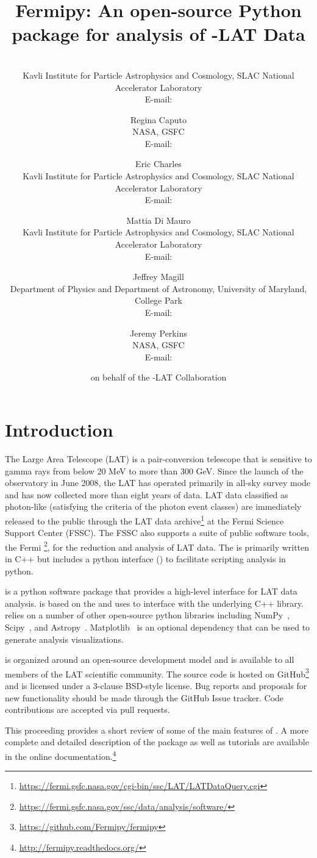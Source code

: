 \documentclass{PoS}
\title{Fermipy: An open-source Python package for analysis of \Fermi-LAT Data}
\author{\speaker{Matthew Wood}\\
  Kavli Institute for Particle Astrophysics and Cosmology, SLAC National Accelerator Laboratory\\
  E-mail: \email{mdwood@slac.stanford.edu}}
\author{Regina Caputo\\
  NASA, GSFC\\
  E-mail: \email{regina.caputo@nasa.gov}}
\author{Eric Charles\\
  Kavli Institute for Particle Astrophysics and Cosmology, SLAC National Accelerator Laboratory\\
  E-mail: \email{echarles@slac.stanford.edu}}
\author{Mattia Di Mauro\\
  Kavli Institute for Particle Astrophysics and Cosmology, SLAC National Accelerator Laboratory\\
  E-mail: \email{mdimauro@slac.stanford.edu}}
\author{Jeffrey Magill\\
  Department of Physics and Department of Astronomy, University of Maryland, College Park\\
  E-mail: \email{jmagill@umd.edu}}
\author{Jeremy Perkins\\
  NASA, GSFC\\
  E-mail: \email{jeremy.s.perkins@nasa.gov}}
\author{on behalf of the \Fermi-LAT Collaboration}
\newcommand{\url}[1]{\href{#1}{#1}}
\begin{document}
\section{Introduction}

The {\Fermi} Large Area Telescope (LAT) is a pair-conversion telescope
that is sensitive to gamma rays from below 20 MeV to more than 300
GeV.  Since the launch of the {\Fermi} observatory in June 2008, the
LAT has operated primarily in all-sky survey mode and has now
collected more than eight years of data.
LAT data classified as photon-like (satisfying the criteria of the
photon event classes) are immediately released to the public
through the LAT data
archive\footnote{\url{https://fermi.gsfc.nasa.gov/cgi-bin/ssc/LAT/LATDataQuery.cgi}}
at the Fermi Science Support Center (FSSC).  The FSSC also supports a
suite of public software tools, the Fermi {\stools}
\footnote{\url{https://fermi.gsfc.nasa.gov/ssc/data/analysis/software/}},
for the reduction and analysis of LAT data.  The {\stools} is
primarily written in C++ but includes a python interface ({\pylike}) to
facilitate scripting analysis in python.



{\fermipy} is a python software package that provides a high-level
interface for LAT data analysis.  {\fermipy} is based on the {\stools}
and uses {\pylike} to interface with the underlying C++ library.
{\fermipy} relies on a number of other open-source python libraries
including NumPy~\cite{oliphant_guide_2006},
Scipy~\cite{scipy}, and
Astropy~\cite{2013A&A...558A..33A}.
Matplotlib~\cite{Hunter:2007:MGE:1251563.1251845} is an optional
dependency that can be used to generate analysis visualizations.

{\fermipy} is organized around an open-source development model and is
available to all members of the LAT scientific community.  The
{\fermipy} source code is hosted on
GitHub\footnote{\url{https://github.com/Fermipy/fermipy}} and is
licensed under a 3-clause BSD-style license.  Bug reports and
proposals for new functionality should be made through the GitHub
Issue tracker.  Code contributions are accepted via pull requests.


This proceeding provides a short review of some of the main features
of {\fermipy}.  A more complete and detailed description of the
package as well as tutorials are available in the online
documentation.\footnote{\url{http://fermipy.readthedocs.org/}}
\end{document}
